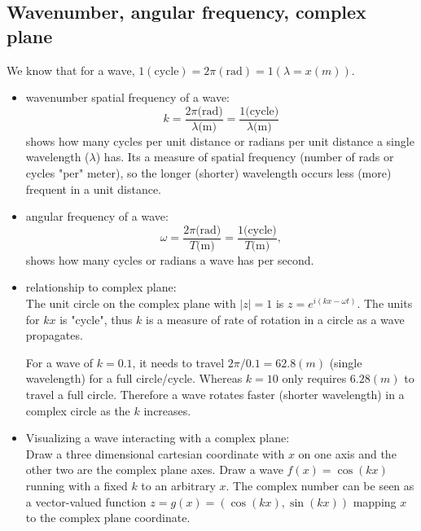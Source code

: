 \subsection{Wavenumber, angular frequency, complex plane}
We know that for a wave, $1 (\text{cycle}) = 2\pi (\text{rad}) = 1 (\lambda = x (m))$.
\begin{itemize}
    \item wavenumber spatial frequency of a wave: \\
        \begin{equation}
            k  = \frac{2 \pi \text{(rad)}}{\lambda \text{(m)}} = \frac{1 \text{(cycle)}}{\lambda \text{(m)}}
        \end{equation}
        shows how many cycles per unit distance or radians per unit distance a single wavelength ($\lambda$) has.
        Its a measure of spatial frequency (number of rads or cycles "per" meter), 
        so the longer (shorter) wavelength occurs less (more) frequent in a unit distance.
    \item angular frequency of a wave: \\
        \begin{equation}
            \omega  = \frac{2 \pi \text{(rad)}}{T \text{(m)}} = \frac{1 \text{(cycle)}}{T \text{(m)}},
        \end{equation}
        shows how many cycles or radians a wave has per second.
    \item relationship to complex plane: \\
        The unit circle on the complex plane with $|z|=1$ is $z = e^{i(kx-\omega t)}$. 
        The units for $kx$ is "cycle", thus $k$ is a measure of rate of rotation in a circle as a wave propagates.
        \begin{exmp}
            For a wave of $k=0.1$, it needs to travel $2\pi/0.1= 62.8(m)$ (single wavelength) for a full circle/cycle.
            Whereas $k=10$ only requires $6.28(m)$ to travel a full circle.
            Therefore a wave rotates faster (shorter wavelength) in a complex circle as the $k$ increases.
        \end{exmp}
    \item Visualizing a wave interacting with a complex plane: \\
        Draw a three dimensional cartesian coordinate with $x$ on one axis and the other two are the complex plane axes.
        Draw a wave $f(x)=\cos(kx)$ running with a fixed $k$ to an arbitrary $x$.
        The complex number can be seen as a vector-valued function $z=g(x)=(\cos(kx),\sin(kx))$ mapping $x$ to the complex plane coordinate.

\end{itemize}
